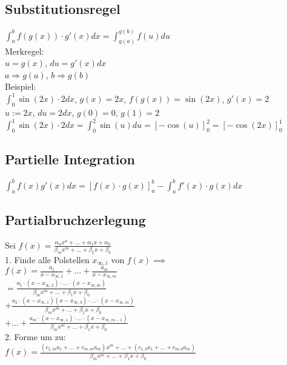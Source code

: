 \documentclass[a4paper,9pt]{extarticle}
\newcommand{\intab}[1] {\int_{a}^{b} #1 dx}
\begin{document}
	\subsection*{Substitutionsregel}
	$\intab{f(g(x)) ⋅ g'(x)} = \int_{g(a)}^{g(b)} f(u) du$ \\
	
	Merkregel: \\
	$u = g(x)$, $du = g'(x) dx$ \\
	$a \Rightarrow g(a)$, $b \Rightarrow g(b)$ \\
	
	Beispiel: \\
	$\int_0^1 \sin(2x) ⋅ 2 dx$, $g(x) = 2x$, $f(g(x)) = \sin(2x)$, $g'(x) = 2$ \\
	$u:= 2x$, $du = 2 dx$, $g(0) = 0$, $g(1) = 2$ \\
	$\int_0^1 \sin(2x) ⋅ 2 dx = \int_0^2 \sin(u) du = [-\cos(u)]_0^2 = [-\cos(2x)]_0^1$
	
	\subsection*{Partielle Integration}
	$\intab{f(x)g'(x)} = [f(x) ⋅ g(x)]_a^b - \intab{f'(x) ⋅ g(x)}$	
	
	\subsection*{Partialbruchzerlegung}
	Sei $f(x) = \frac{\alpha_nx^n + \dots + \alpha_1x + \alpha_0}{\beta_mx^m + \dots + \beta_1x + \beta_0}$ \\
	
	1. Finde alle Polstellen $x_{∞,i}$ von $f(x) \implies$ \\
	$f(x) = \frac{a_1}{x - x_{∞,1}} + \dots + \frac{a_m}{x - x_{∞,m}}$ \\
	$ = \frac{a_1 ⋅ (x - x_{∞,2}) ⋅ \dots ⋅ (x - x_{∞,m})}{\beta_mx^m + \dots + \beta_1x + \beta_0}$ \\
	$ + \frac{a_2 ⋅ (x - x_{∞,1})(x - x_{∞,3}) ⋅ \dots ⋅ (x - x_{∞,m})}{\beta_mx^m + \dots + \beta_1x + \beta_0}$ \\
	$ + \dots + \frac{a_m ⋅ (x - x_{∞,1}) ⋅ \dots ⋅ (x - x_{∞,m-1})}{\beta_mx^m + \dots + \beta_1x + \beta_0}$ \\
	
	2. Forme um zu: \\
	$ f(x) = \frac{(c_{1,m}a_1 + \dots + c_{m,m}a_m)x^m + \dots + (c_{1,0}a_1 + \dots + c_{m,0}a_m)}{\beta_mx^m + \dots + \beta_1x + \beta_0}$ \\
	
\end{document}
